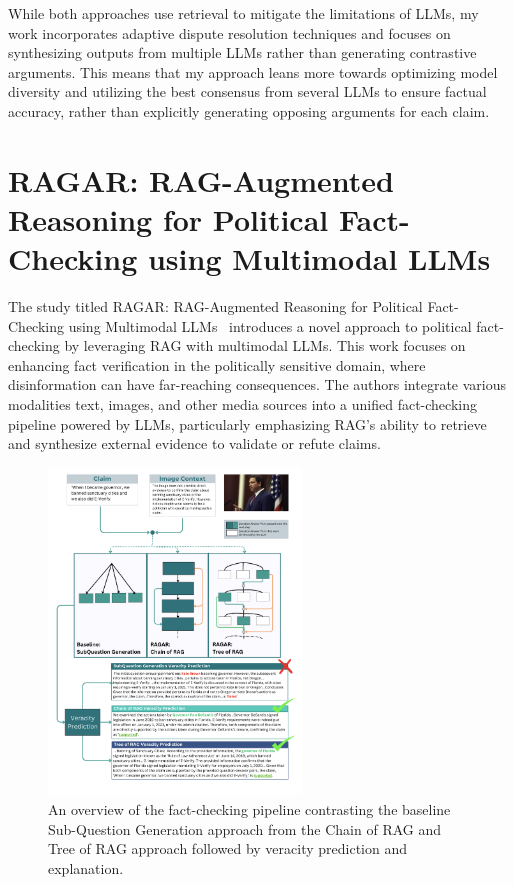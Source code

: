 While both approaches use retrieval to mitigate the limitations of LLMs, my work incorporates adaptive dispute resolution techniques and focuses on synthesizing outputs from multiple LLMs rather than generating contrastive arguments.
This means that my approach leans more towards optimizing model diversity and utilizing the best consensus from several LLMs to ensure factual accuracy, rather than explicitly generating opposing arguments for each claim.

\section{RAGAR: RAG-Augmented Reasoning for Political Fact-Checking using Multimodal LLMs}\label{sec:agar-rag-augmented-reasoning}
The study titled RAGAR: RAG-Augmented Reasoning for Political Fact-Checking using Multimodal LLMs~\cite{khaliq2024ragarfalsehoodradarragaugmented} introduces a novel approach to political fact-checking by leveraging RAG with multimodal LLMs.
This work focuses on enhancing fact verification in the politically sensitive domain, where disinformation can have far-reaching consequences.
The authors integrate various modalities text, images, and other media sources into a unified fact-checking pipeline powered by LLMs, particularly emphasizing RAG’s ability to retrieve and synthesize external evidence to validate or refute claims.

\begin{figure}[ht!]
    \centering
    \begin{minipage}[b]{\textwidth}
        \centering
        \includegraphics[width=0.6\textwidth]{res/rel-ragar}
    \end{minipage}
    \caption{An overview of the fact-checking pipeline contrasting the baseline Sub-Question Generation approach from the Chain of RAG and Tree of RAG approach followed by veracity prediction and explanation.}
    \label{fig:rel-ragar}
\end{figure}

